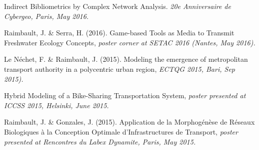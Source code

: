 \noindent Indirect Bibliometrics by Complex Network Analysis. \textit{20e Anniversaire de Cybergeo, Paris, May 2016.}


\bigskip

\noindent Raimbault, J. \& Serra, H. (2016). Game-based Tools as Media to Transmit Freshwater Ecology Concepts, \textit{poster corner at SETAC 2016 (Nantes, May 2016).}


\bigskip

\noindent Le Néchet, F. \& Raimbault, J. (2015). Modeling the emergence of metropolitan transport authority in a polycentric urban region, \textit{ECTQG 2015, Bari, Sep 2015).}


\bigskip

\noindent Hybrid Modeling of a Bike-Sharing Transportation System, \textit{poster presented at ICCSS 2015, Helsinki, June 2015.}

\bigskip

\noindent Raimbault, J. \& Gonzales, J. (2015). Application de la Morphog{\'e}n{\`e}se de R{\'e}seaux Biologiques {\`a} la Conception Optimale d'Infrastructures de Transport, \textit{poster presented at Rencontres du Labex Dynamite, Paris, May 2015.}


